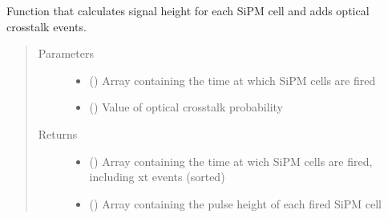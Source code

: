 \documentclass[letterpaper,10pt,english]{sphinxmanual}
\begin{document}
\begin{fulllineitems}
\label{\detokenize{structure:libs.lib.evtsGen}}
Function that calculates signal height for each SiPM cell and adds optical crosstalk events.
\begin{quote}\begin{description}
\item[{Parameters}] \leavevmode\begin{itemize}
\item {} 
 () \textendash{} Array containing the time at which SiPM cells are fired

\item {} 
 () \textendash{} Value of optical crosstalk probability

\end{itemize}

\item[{Returns}] \leavevmode
\begin{itemize}
\item {} 
 () \textendash{} Array containing the time at wich SiPM cells are fired, including xt events (sorted)

\item {} 
 () \textendash{} Array containing the pulse height of each fired SiPM cell

\end{itemize}


\end{description}\end{quote}

\end{fulllineitems}

\end{document}
